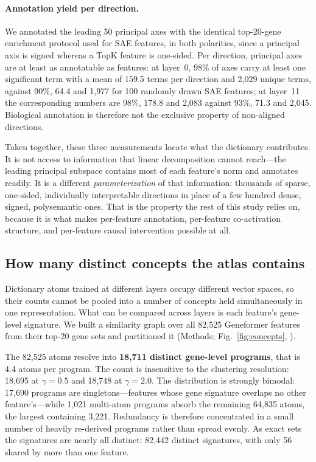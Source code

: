 \paragraph{Annotation yield per direction.} We annotated the leading 50 principal axes with the
identical top-20-gene enrichment protocol used for SAE features, in both polarities, since a
principal axis is signed whereas a TopK feature is one-sided. Per direction, principal axes are at
least as annotatable as features: at layer~0, 98\% of axes carry at least one significant term with
a mean of 159.5 terms per direction and 2,029 unique terms, against 90\%, 64.4 and 1,977 for 100
randomly drawn SAE features; at layer~11 the corresponding numbers are 98\%, 178.8 and 2,083 against
93\%, 71.3 and 2,045. Biological annotation is therefore not the exclusive property of
non-aligned directions.

Taken together, these three measurements locate what the dictionary contributes. It is not access to
information that linear decomposition cannot reach---the leading principal subspace contains most of
each feature's norm and annotates readily. It is a different \emph{parameterization} of that
information: thousands of sparse, one-sided, individually interpretable directions in place of a few
hundred dense, signed, polysemantic ones. That is the property the rest of this study relies on,
because it is what makes per-feature annotation, per-feature co-activation structure, and
per-feature causal intervention possible at all.

\subsection*{How many distinct concepts the atlas contains}
\label{sec:concepts}

Dictionary atoms trained at different layers occupy different vector spaces, so their counts cannot
be pooled into a number of concepts held simultaneously in one representation. What can be compared
across layers is each feature's gene-level signature. We built a similarity graph over all 82,525
Geneformer features from their top-20 gene sets and partitioned it (Methods; Fig.~\ref{fig:concepts},
).

The 82,525 atoms resolve into \textbf{18,711 distinct gene-level programs}, that is 4.4 atoms per
program. The count is insensitive to the clustering resolution: 18,695 at $\gamma{=}0.5$ and 18,748
at $\gamma{=}2.0$. The distribution is strongly bimodal: 17,690 programs are singletons---features
whose gene signature overlaps no other feature's---while 1,021 multi-atom programs absorb the
remaining 64,835 atoms, the largest containing 3,221. Redundancy is therefore concentrated in a
small number of heavily re-derived programs rather than spread evenly. As exact sets the signatures
are nearly all distinct: 82,442 distinct signatures, with only 56 shared by more than one feature.

